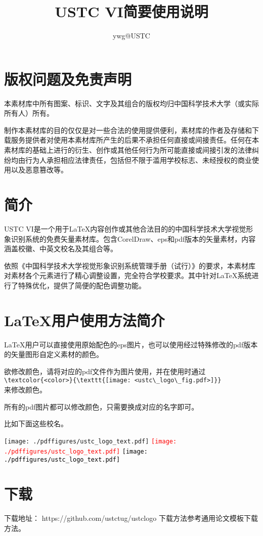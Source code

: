 \documentclass{article}
\title{USTC VI简要使用说明}
\author{ywg@USTC}
\date{}
\begin{document}
\maketitle
\section{版权问题及免责声明}
本素材库中所有图案、标识、文字及其组合的版权均归中国科学技术大学（或实际所有人）所有。

制作本素材库的目的仅仅是对一些合法的使用提供便利，素材库的作者及存储和下载服务提供者对使用本素材库所产生的后果不承担任何直接或间接责任。任何在本素材库的基础上进行的衍生、创作或其他任何行为所可能直接或间接引发的法律纠纷均由行为人承担相应法律责任，包括但不限于滥用学校标志、未经授权的商业使用以及恶意篡改等。

\section{简介}
USTC VI是一个用于\LaTeX{}内容创作或其他合法目的的中国科学技术大学视觉形象识别系统的免费矢量素材库。包含CorelDraw、eps和pdf版本的矢量素材，内容涵盖校徽、中英文校名及其组合等。

依照《中国科学技术大学视觉形象识别系统管理手册（试行）》的要求，本素材库对素材各个元素进行了精心调整设置，完全符合学校要求。其中针对\LaTeX{}系统进行了特殊优化，提供了简便的配色调整功能。

\section{\LaTeX{}用户使用方法简介}
\LaTeX{}用户可以直接使用原始配色的eps图片，也可以使用经过特殊修改的pdf版本的矢量图形自定义素材的颜色。

欲修改颜色，请将对应的pdf文件作为图片使用，并在使用时通过 \\
\verb|\textcolor{<color>}{\texttt{[image: <ustc\_logo\_fig.pdf>]}}| \\
来修改颜色。

所有的pdf图片都可以修改颜色，只需要换成对应的名字即可。

比如下面这些校名。

\noindent
\textcolor{ustcblue}{\texttt{[image: ./pdffigures/ustc\_logo\_text.pdf]}}
\textcolor{red}{\texttt{[image: ./pdffigures/ustc\_logo\_text.pdf]}}
\textcolor{black}{\texttt{[image: ./pdffigures/ustc\_logo\_text.pdf]}}

\section{下载}
下载地址： https://github.com/ustctug/ustclogo
下载方法参考通用论文模板下载方法。
\end{document}
